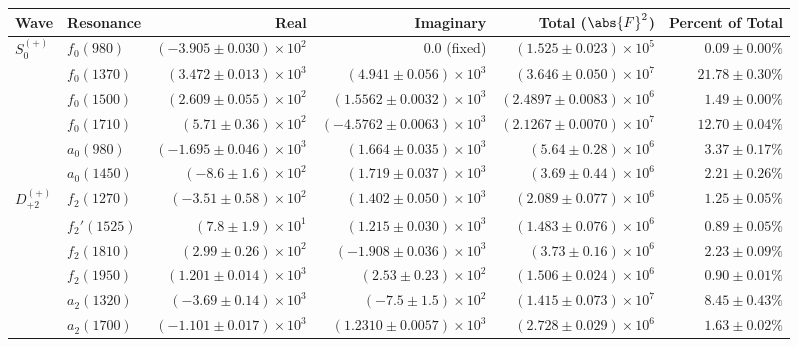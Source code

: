 \begin{table}[ht]
    \begin{center}
        \begin{tabular}{llrrrr}\toprule
        Wave & Resonance & Real & Imaginary & Total ($\abs{F}^2$) & Percent of Total \\\midrule
$S_{0}^{(+)}$ & $f_{0}(980)$ & $(-3.905 \pm 0.030) \times 10^{2}$ & $0.0$ (fixed) & $(1.525 \pm 0.023) \times 10^{5}$ & $0.09 \pm 0.00 \%$ \\
 & $f_{0}(1370)$ & $(3.472 \pm 0.013) \times 10^{3}$ & $(4.941 \pm 0.056) \times 10^{3}$ & $(3.646 \pm 0.050) \times 10^{7}$ & $21.78 \pm 0.30 \%$ \\
 & $f_{0}(1500)$ & $(2.609 \pm 0.055) \times 10^{2}$ & $(1.5562 \pm 0.0032) \times 10^{3}$ & $(2.4897 \pm 0.0083) \times 10^{6}$ & $1.49 \pm 0.00 \%$ \\
 & $f_{0}(1710)$ & $(5.71 \pm 0.36) \times 10^{2}$ & $(-4.5762 \pm 0.0063) \times 10^{3}$ & $(2.1267 \pm 0.0070) \times 10^{7}$ & $12.70 \pm 0.04 \%$ \\
 & $a_{0}(980)$ & $(-1.695 \pm 0.046) \times 10^{3}$ & $(1.664 \pm 0.035) \times 10^{3}$ & $(5.64 \pm 0.28) \times 10^{6}$ & $3.37 \pm 0.17 \%$ \\
 & $a_{0}(1450)$ & $(-8.6 \pm 1.6) \times 10^{2}$ & $(1.719 \pm 0.037) \times 10^{3}$ & $(3.69 \pm 0.44) \times 10^{6}$ & $2.21 \pm 0.26 \%$ \\
$D_{+2}^{(+)}$ & $f_{2}(1270)$ & $(-3.51 \pm 0.58) \times 10^{2}$ & $(1.402 \pm 0.050) \times 10^{3}$ & $(2.089 \pm 0.077) \times 10^{6}$ & $1.25 \pm 0.05 \%$ \\
 & $f_{2}'(1525)$ & $(7.8 \pm 1.9) \times 10^{1}$ & $(1.215 \pm 0.030) \times 10^{3}$ & $(1.483 \pm 0.076) \times 10^{6}$ & $0.89 \pm 0.05 \%$ \\
 & $f_{2}(1810)$ & $(2.99 \pm 0.26) \times 10^{2}$ & $(-1.908 \pm 0.036) \times 10^{3}$ & $(3.73 \pm 0.16) \times 10^{6}$ & $2.23 \pm 0.09 \%$ \\
 & $f_{2}(1950)$ & $(1.201 \pm 0.014) \times 10^{3}$ & $(2.53 \pm 0.23) \times 10^{2}$ & $(1.506 \pm 0.024) \times 10^{6}$ & $0.90 \pm 0.01 \%$ \\
 & $a_{2}(1320)$ & $(-3.69 \pm 0.14) \times 10^{3}$ & $(-7.5 \pm 1.5) \times 10^{2}$ & $(1.415 \pm 0.073) \times 10^{7}$ & $8.45 \pm 0.43 \%$ \\
 & $a_{2}(1700)$ & $(-1.101 \pm 0.017) \times 10^{3}$ & $(1.2310 \pm 0.0057) \times 10^{3}$ & $(2.728 \pm 0.029) \times 10^{6}$ & $1.63 \pm 0.02 \%$ \\

\end{tabular}
\end{center}
\end{table}
